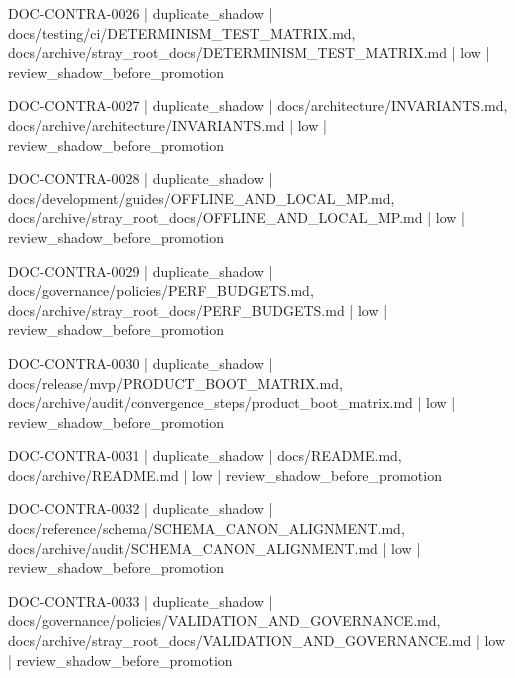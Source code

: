 \documentclass[11pt,a4paper]{report}
\begin{document}
{\small\ttfamily\raggedright DOC-\allowbreak{}CONTRA-\allowbreak{}0026 | duplicate\_shadow | docs/\allowbreak{}testing/\allowbreak{}ci/\allowbreak{}DETERMINISM\_TEST\_MATRIX.\allowbreak{}md, docs/\allowbreak{}archive/\allowbreak{}stray\_root\_docs/\allowbreak{}DETERMINISM\_TEST\_MATRIX.\allowbreak{}md | low | review\_shadow\_before\_promotion\par}
{\small\ttfamily\raggedright DOC-\allowbreak{}CONTRA-\allowbreak{}0027 | duplicate\_shadow | docs/\allowbreak{}architecture/\allowbreak{}INVARIANTS.\allowbreak{}md, docs/\allowbreak{}archive/\allowbreak{}architecture/\allowbreak{}INVARIANTS.\allowbreak{}md | low | review\_shadow\_before\_promotion\par}
{\small\ttfamily\raggedright DOC-\allowbreak{}CONTRA-\allowbreak{}0028 | duplicate\_shadow | docs/\allowbreak{}development/\allowbreak{}guides/\allowbreak{}OFFLINE\_AND\_LOCAL\_MP.\allowbreak{}md, docs/\allowbreak{}archive/\allowbreak{}stray\_root\_docs/\allowbreak{}OFFLINE\_AND\_LOCAL\_MP.\allowbreak{}md | low | review\_shadow\_before\_promotion\par}
{\small\ttfamily\raggedright DOC-\allowbreak{}CONTRA-\allowbreak{}0029 | duplicate\_shadow | docs/\allowbreak{}governance/\allowbreak{}policies/\allowbreak{}PERF\_BUDGETS.\allowbreak{}md, docs/\allowbreak{}archive/\allowbreak{}stray\_root\_docs/\allowbreak{}PERF\_BUDGETS.\allowbreak{}md | low | review\_shadow\_before\_promotion\par}
{\small\ttfamily\raggedright DOC-\allowbreak{}CONTRA-\allowbreak{}0030 | duplicate\_shadow | docs/\allowbreak{}release/\allowbreak{}mvp/\allowbreak{}PRODUCT\_BOOT\_MATRIX.\allowbreak{}md, docs/\allowbreak{}archive/\allowbreak{}audit/\allowbreak{}convergence\_steps/\allowbreak{}product\_boot\_matrix.\allowbreak{}md | low | review\_shadow\_before\_promotion\par}
{\small\ttfamily\raggedright DOC-\allowbreak{}CONTRA-\allowbreak{}0031 | duplicate\_shadow | docs/\allowbreak{}README.\allowbreak{}md, docs/\allowbreak{}archive/\allowbreak{}README.\allowbreak{}md | low | review\_shadow\_before\_promotion\par}
{\small\ttfamily\raggedright DOC-\allowbreak{}CONTRA-\allowbreak{}0032 | duplicate\_shadow | docs/\allowbreak{}reference/\allowbreak{}schema/\allowbreak{}SCHEMA\_CANON\_ALIGNMENT.\allowbreak{}md, docs/\allowbreak{}archive/\allowbreak{}audit/\allowbreak{}SCHEMA\_CANON\_ALIGNMENT.\allowbreak{}md | low | review\_shadow\_before\_promotion\par}
{\small\ttfamily\raggedright DOC-\allowbreak{}CONTRA-\allowbreak{}0033 | duplicate\_shadow | docs/\allowbreak{}governance/\allowbreak{}policies/\allowbreak{}VALIDATION\_AND\_GOVERNANCE.\allowbreak{}md, docs/\allowbreak{}archive/\allowbreak{}stray\_root\_docs/\allowbreak{}VALIDATION\_AND\_GOVERNANCE.\allowbreak{}md | low | review\_shadow\_before\_promotion\par}
\end{document}
